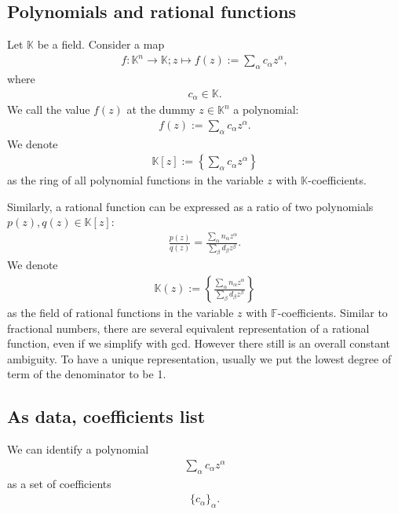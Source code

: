 \documentclass[11pt]{book}
\begin{document}
\subsection{Polynomials and rational functions}
Let $\mathbb{K}$ be a field.
Consider a map
\begin{eqnarray}
f : \mathbb{K}^n \to \mathbb{K}; z \mapsto f(z) := \sum_\alpha c_\alpha z^\alpha,
\end{eqnarray}
where
\begin{eqnarray}
c_\alpha \in \mathbb{K}.
\end{eqnarray}
We call the value $f(z)$ at the dummy $z \in \mathbb{K}^n$ a polynomial:
\begin{eqnarray}
f(z) := \sum_\alpha c_\alpha z^\alpha.
\end{eqnarray}
We denote
\begin{eqnarray}
\mathbb{K}[z] := \left\{ \sum_\alpha c_\alpha z^\alpha \right\}
\end{eqnarray}
as the ring of all polynomial functions in the variable $z$ with $\mathbb{K}$-coefficients.

Similarly, a rational function can be expressed as a ratio of two polynomials $p(z),q(z) \in \mathbb{K}[z]$:
\begin{eqnarray}
\frac{p(z)}{q(z)} = \frac{\sum_\alpha n_\alpha z^\alpha}{\sum_\beta d_\beta z^\beta}.
\end{eqnarray}
We denote
\begin{eqnarray}
\mathbb{K}(z) := \left\{ \frac{\sum_\alpha n_\alpha z^\alpha}{\sum_\beta d_\beta z^\beta} \right\}
\end{eqnarray}
as the field of rational functions in the variable $z$ with $\mathbb{F}$-coefficients.
Similar to fractional numbers, there are several equivalent representation of a rational function, even if we simplify with gcd.
However there still is an overall constant ambiguity.
To have a unique representation, usually we put the lowest degree of term of the denominator to be 1.

\subsection{As data, coefficients list}
We can identify a polynomial
\begin{eqnarray}
\sum_\alpha c_\alpha z^\alpha
\end{eqnarray}
as a set of coefficients
\begin{eqnarray}
\{ c_\alpha\}_{\alpha}.
\end{eqnarray}
\end{document}
